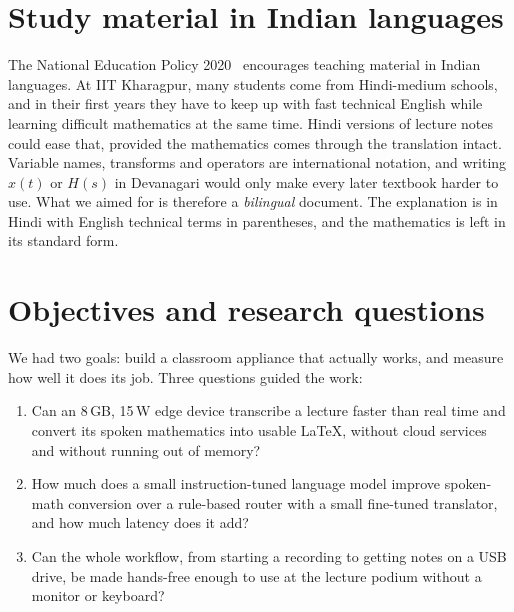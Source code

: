 \documentclass[11pt,a4paper,oneside]{report}
\theoremstyle{definition}
\begin{document}
\section{Study material in Indian languages}
The National Education Policy 2020~\cite{nep2020} encourages teaching material in Indian languages. At IIT Kharagpur, many students come from Hindi-medium schools, and in their first years they have to keep up with fast technical English while learning difficult mathematics at the same time. Hindi versions of lecture notes could ease that, provided the mathematics comes through the translation intact. Variable names, transforms and operators are international notation, and writing $x(t)$ or $H(s)$ in Devanagari would only make every later textbook harder to use. What we aimed for is therefore a \emph{bilingual} document. The explanation is in Hindi with English technical terms in parentheses, and the mathematics is left in its standard form.

\section{Objectives and research questions}
We had two goals: build a classroom appliance that actually works, and measure how well it does its job. Three questions guided the work:
\begin{enumerate}[label=\textbf{RQ\arabic*.},leftmargin=3em]
  \item Can an 8\,GB, 15\,W edge device transcribe a lecture faster than real time and convert its spoken mathematics into usable LaTeX, without cloud services and without running out of memory?
  \item How much does a small instruction-tuned language model improve spoken-math conversion over a rule-based router with a small fine-tuned translator, and how much latency does it add?
  \item Can the whole workflow, from starting a recording to getting notes on a USB drive, be made hands-free enough to use at the lecture podium without a monitor or keyboard?
\end{enumerate}
\end{document}
